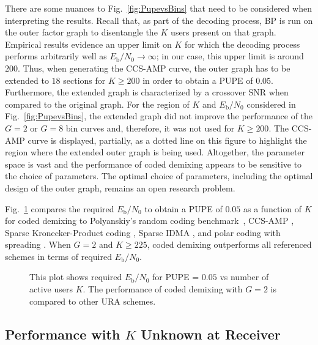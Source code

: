 \documentclass[journal]{IEEEtran}
\begin{document}
There are some nuances to Fig.~\ref{fig:PupevsBins} that need to be considered when interpreting the results. 
Recall that, as part of the decoding process, BP is run on the outer factor graph to disentangle the $K$ users present on that graph. 
Empirical results evidence an upper limit on $K$ for which the decoding process performs arbitrarily well as $E_{\mathrm{b}}/N_0 \rightarrow \infty$; in our case, this upper limit is around $200$.
Thus, when generating the CCS-AMP curve, the outer graph has to be extended to $18$ sections for $K \geq 200$ in order to obtain a PUPE of $0.05$.
Furthermore, the extended graph is characterized by a crossover SNR when compared to the original graph.
For the region of $K$ and $E_{\mathrm{b}}/N_0$ considered in Fig.~\ref{fig:PupevsBins}, the extended graph did not improve the performance of the $G = 2$ or $G = 8$ bin curves and, therefore, it was not used for $K \geq 200$.
The CCS-AMP curve is displayed, partially, as a dotted line on this figure to highlight the region where the extended outer graph is being used.
Altogether, the parameter space is vast and the performance of coded demixing appears to be sensitive to the choice of parameters. 
The optimal choice of parameters, including the optimal design of the outer graph, remains an open research problem. 

Fig.~\ref{fig:PupevsScheme} compares the required $E_{\mathrm{b}}/N_0$ to obtain a PUPE of $0.05$ as a function of $K$ for coded demixing to Polyanskiy's random coding benchmark~\cite{polyanskiy2017perspective}, CCS-AMP \cite{amalladinne2020unsourced}, Sparse Kronecker-Product coding \cite{han2021sparse}, Sparse IDMA \cite{pradhan2020sparse}, and polar coding with spreading \cite{pradhan2019polar}. 
When $G = 2$ and $K \geq 225$, coded demixing outperforms all referenced schemes in terms of required $E_{\mathrm{b}}/N_0$. 

\begin{figure}[ht!]
    \centering
    
    \caption{This plot shows required $E_{\mathrm{b}}/N_0$ for PUPE = $0.05$ vs number of active users $K$. The performance of coded demixing with $G = 2$ is compared to other URA schemes.}
    \label{fig:PupevsScheme}
\end{figure}

\subsection{Performance with $K$ Unknown at Receiver}
\end{document}
